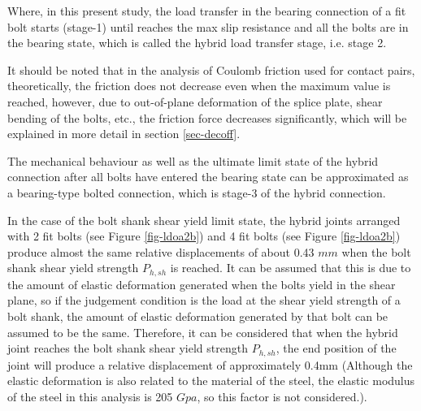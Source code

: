 Where, in this present study, the load transfer in the bearing connection of a fit bolt starts (stage-1) until reaches the max slip resistance and all the bolts are in the bearing state, which is called the hybrid load transfer stage, i.e. stage 2.

It should be noted that in the analysis of Coulomb friction used for contact pairs, theoretically, the friction does not decrease even when the maximum value is reached, however, due to out-of-plane deformation of the splice plate, shear bending of the bolts, etc., the friction force decreases significantly, which will be explained in more detail in section \ref{sec-decoff}.

The mechanical behaviour as well as the ultimate limit state of the hybrid connection after all bolts have entered the bearing state can be approximated as a bearing-type bolted connection, which is stage-3 of the hybrid connection.

In the case of the bolt shank shear yield limit state, the hybrid joints arranged with 2 fit bolts (see Figure \ref{fig-ldoa2b}) and 4 fit bolts (see Figure \ref{fig-ldoa2b}) produce almost the same relative displacements of about 0.43 $mm$ when the bolt shank shear yield strength $P_{h,sh}$ is reached. It can be assumed that this is due to the amount of elastic deformation generated when the bolts yield in the shear plane, so if the judgement condition is the load at the shear yield strength of a bolt shank, the amount of elastic deformation generated by that bolt can be assumed to be the same. Therefore, it can be considered that when the hybrid joint reaches the bolt shank shear yield strength $P_{h,sh}$, the end position of the joint will produce a relative displacement of approximately 0.4mm (Although the elastic deformation is also related to the material of the steel, the elastic modulus of the steel in this analysis is 205 $Gpa$, so this factor is not considered.).




